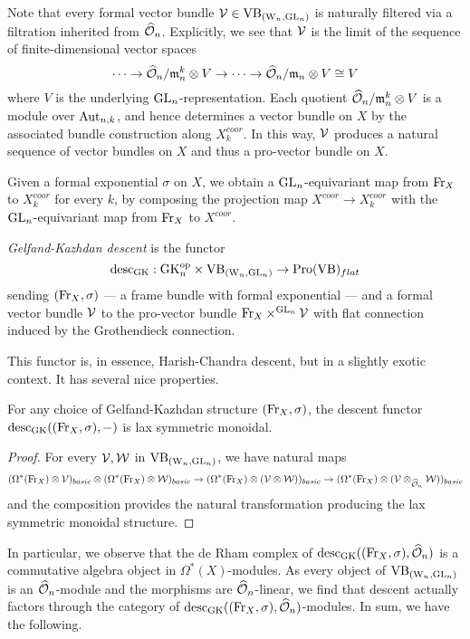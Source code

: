 \documentclass[10pt]{amsart}
\begin{document}
Note that every formal vector bundle $\mathcal{V} \in {\rm VB}_{({{\rm W}_n}, {\rm GL}_n)}$ is naturally filtered via a filtration inherited from $\widehat{\mathcal O}_n$. 
Explicitly, we see that $\mathcal{V}$ is the limit of the sequence of finite-dimensional vector spaces
\[
\cdots \to \widehat{\mathcal O}_n/{\mathfrak m}_n^k \otimes V \to \cdots \to \widehat{\mathcal O}_n/{\mathfrak m}_n \otimes V \cong V
\]
where $V$ is the underlying ${\rm GL}_n$-representation.
Each quotient $\widehat{\mathcal O}_n/{\mathfrak m}_n^k \otimes V$ is a module over ${\rm Aut}_{n,k}$, and 
hence determines a vector bundle on $X$ by the associated bundle construction along $X^{coor}_k$.
In this way, $\mathcal{V}$ produces a natural sequence of vector bundles on $X$ and thus a pro-vector bundle on $X$.

Given a formal exponential $\sigma$ on $X$, we obtain a ${\rm GL}_n$-equivariant map from ${\rm Fr}_X$ to $X^{coor}_k$ for every $k$,
by composing the projection map $X^{coor} \to X_k^{coor}$ with the ${\rm GL}_n$-equivariant map from ${\rm Fr}_X$ to $X^{coor}$.

\begin{dfn}
{\em Gelfand-Kazhdan descent} is the functor
\[
{\rm desc}_{\rm GK}: {\rm GK}_n^{{\rm op}} \times {\rm VB}_{({{\rm W}_n}, {\rm GL}_n)} \to {\rm Pro}({\rm VB})_{flat}
\]
sending $({\rm Fr}_X,\sigma)$ --- a frame bundle with formal exponential
--- and a formal vector bundle $\mathcal{V}$ 
to the pro-vector bundle ${\rm Fr}_X \times^{{\rm GL}_n} \mathcal{V}$ with flat connection induced by the Grothendieck connection.
\end{dfn}

This functor is, in essence, Harish-Chandra descent, but in a slightly exotic context.
It has several nice properties.

\begin{lem}\label{prop lax}
For any choice of Gelfand-Kazhdan structure $({\rm Fr}_X,\sigma)$, the descent functor ${\rm desc}_{\rm GK}(({\rm Fr}_X,\sigma),-)$ is lax symmetric monoidal.
\end{lem}

\begin{proof}
For every $\mathcal{V},\mathcal{W}$ in ${\rm VB}_{({{\rm W}_n}, {\rm GL}_n)}$, we have natural maps
\[
(\Omega^*({\rm Fr}_X) \otimes \mathcal{V})_{basic} \otimes (\Omega^*({\rm Fr}_X) \otimes \mathcal{W})_{basic} \to (\Omega^*({\rm Fr}_X) \otimes (\mathcal{V} \otimes \mathcal{W}))_{basic} \to (\Omega^*({\rm Fr}_X) \otimes (\mathcal{V} \otimes_{\widehat{\mathcal O}_n} \mathcal{W}))_{basic}
\]
and the composition provides the natural transformation producing the lax symmetric monoidal structure.
\end{proof}

In particular, we observe that the de Rham complex of ${\rm desc}_{\rm GK}(({\rm Fr}_X,\sigma),\widehat{\mathcal O}_n)$ is a commutative algebra object in $\Omega^*(X)$-modules. 
As every object of ${\rm VB}_{({{\rm W}_n}, {\rm GL}_n)}$ is an $\widehat{\mathcal O}_n$-module and the morphisms are $\widehat{\mathcal O}_n$-linear, 
we find that descent actually factors through the category of ${\rm desc}_{\rm GK}(({\rm Fr}_X,\sigma),\widehat{\mathcal O}_n)$-modules. 
In sum, we have the following.
\end{document}
